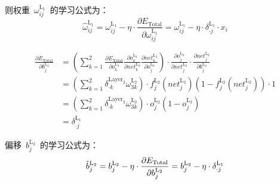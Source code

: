 \documentclass[a4paper, UTF8, heading = true, scheme = chinese, linespread = 1.66, titlepage]{ctexart}
\begin{document}
则权重~$\omega^{\text{L}_1}_{ij}$~的学习公式为：
\begin{equation}
\widehat{\omega}^{\text{L}_1}_{ij} = \omega^{\text{L}_1}_{ij} - \eta \cdot \frac{\partial E_{\text{Total}}}{\partial \omega^{\text{L}_1}_{ij}} 
= \omega^{\text{L}_1}_{ij} - \eta \cdot \delta^{\text{L}_1}_{\cdot j} \cdot x_i
\end{equation}

\begin{align}
\frac{\partial E_{\text{Total}}}{\partial b^{\text{L}_2}_{j}}
&= (\sum_{k=1}^{2}{\frac{\partial E_{\text{Total}}}{\partial o^{\text{L}_3}_{k}} \frac{\partial o^{\text{L}_3}_{k}}{\partial net^{\text{L}_3}_k} \frac{\partial net^{\text{L}_3}_k}{\partial o^{\text{L}_2}_{j}}})  \cdot \frac{\partial o^{\text{L}_2}_{j}}{\partial net^{\text{L}_2}_j} \cdot \frac{\partial net^{\text{L}_2}_j}{\partial b^{\text{L}_2}_{j}} \\
&= (\sum_{k=1}^{2}{\delta^{\text{Layer}_2}_{\cdot k} \omega^{\text{L}_2}_{3k}}) \cdot f^{\text{L}_2}_{j}{(net^{\text{L}_2}_j)}(1 - f^{\text{L}_2}_{j}{(net^{\text{L}_2}_j)}) \cdot 1 \\
&= (\sum_{k=1}^{2}{\delta^{\text{Layer}_2}_{\cdot k} \omega^{\text{L}_2}_{3k}}) \cdot o^{\text{L}_2}_{j}(1 - o^{\text{L}_2}_{j}) \\
&= \delta^{\text{L}_1}_{\cdot j}
\end{align}

偏移~$b^{\text{L}_2}_{j}$~的学习公式为：
\begin{equation}
\hat{b}^{\text{L}_2}_{j} = b^{\text{L}_2}_{j} - \eta \cdot \frac{\partial E_{\text{Total}}}{\partial b^{\text{L}_2}_{j}} \\
= b^{\text{L}_2}_{j} - \eta \cdot \delta^{\text{L}_1}_{\cdot j}
\end{equation}
\end{document}
